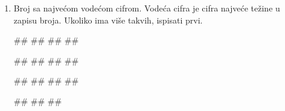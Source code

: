 \begin{Exercise}[label=PET_22]
\begin{enumerate}
\begin{miditest}
\begin{upotreba}{3}
#\naslovInt#
##
#
\end{upotreba}
\end{miditest}
\begin{miditest}
\begin{upotreba}{4}
#\naslovInt#
##
##
\end{upotreba}
\end{miditest}

\begin{miditest}
\begin{upotreba}{5}
#\naslovInt#
##
##
##
\end{upotreba}
\end{miditest}
\begin{miditest}
\begin{upotreba}{6}
#\naslovInt#
##
##
##
\end{upotreba}
\end{miditest}

\item Broj sa najvećom vodećom cifrom. Vodeća cifra je cifra najveće težine u zapisu broja. Ukoliko ima više takvih, ispisati prvi.

\begin{miditest}
\begin{upotreba}{1}
#\naslovInt#
##
##
##
\end{upotreba}
\end{miditest}
\begin{miditest}
\begin{upotreba}{2}
#\naslovInt#
##
##
##
\end{upotreba}
\end{miditest}

\begin{miditest}
\begin{upotreba}{3}
#\naslovInt#
##
##
##
\end{upotreba}
\end{miditest}
\begin{miditest}
\begin{upotreba}{4}
#\naslovInt#
##
##
\end{upotreba}
\end{miditest}
\end{enumerate}

\end{Exercise}
